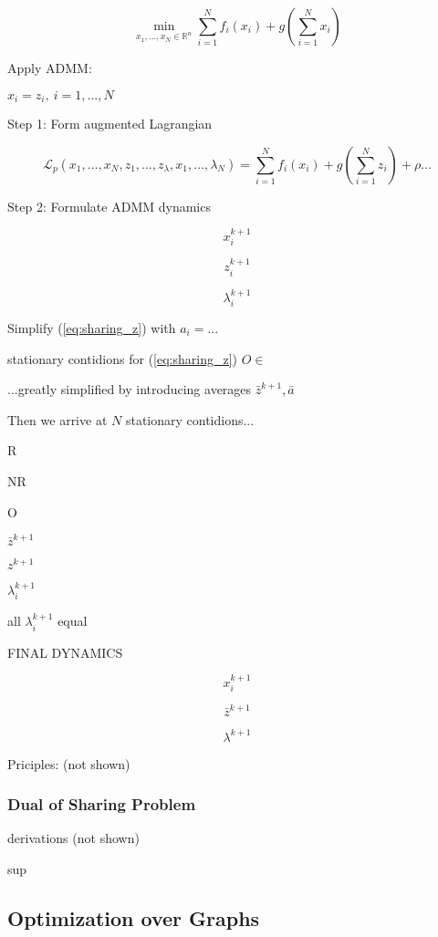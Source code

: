 $$\min_{x_1,\dots,x_N \in \mathbb{R}^{n}} \sum_{i = 1}^{N} f_i(x_i) +  g( \sum_{i = 1}^{N} x_i )$$

Apply ADMM:

$x_i=z_i,\ i=1,\dots,N$

Step 1: Form augmented Lagrangian

$$\mathcal{L}_p(x_1,\dots,x_N,z_1,\dots,z_\lambda,x_1,\dots,\lambda_N)=
	\sum_{i = 1}^{N} f_i(x_i) +  g( \sum_{i = 1}^{N} z_i)
	+ \rho ... $$

Step 2: Formulate ADMM dynamics

\begin{equation}
	x_i^{k+1}
	\label{eq:sharing_x}
\end{equation}

\begin{equation}
	z_i^{k+1}
	\label{eq:sharing_z}
\end{equation}

\begin{equation}
	\lambda_i^{k+1}
	\label{eq:sharing_l}
\end{equation}

Simplify (\ref{eq:sharing_z}) with $a_i=...$

stationary contidions for (\ref{eq:sharing_z})
$O \in$

...greatly simplified by introducing averages
$\bar{z}^{k+1}, \bar{a}$

Then we arrive at $N$ stationary contidions...

R

NR

O

$\bar{z}^{k+1}$

$z^{k+1}$

$\lambda_i^{k+1}$

all $\lambda_i^{k+1}$ equal

FINAL DYNAMICS

$$x_i^{k+1}$$

$$\bar{z}^{k+1}$$

$$\lambda^{k+1}$$

Priciples: (not shown)

\subsubsection{Dual of Sharing Problem}

derivations (not shown)

sup

\subsection{Optimization over Graphs}

